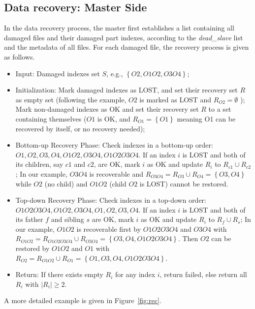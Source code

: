 \documentclass[conference]{IEEEtran}
\begin{document}
\subsection{Data recovery: Master Side}
In the data recovery process, the master first establishes a list containing all damaged files and their damaged part indexes, according to the \textit{dead\_slave} list and the metadata of all files. For each damaged file, the recovery process is given as follows.
\begin{itemize}
\item Input: Damaged indexes set $S$, e.g., $\left\{O2, O1O2, O3O4\right\}$;
\item Initialization: Mark damaged indexes as LOST, and set their recovery set $R$ as empty set (following the example, $O2$ is marked as LOST and $R_{O2} = \emptyset$ ); Mark non-damaged indexes as OK and set their recovery set $R$ to a set containing themselves ($O1$ is OK, and $R_{O1} = \left\{O1\right\}$ meaning O1 can be recovered by itself, or no recovery needed);
\item Bottom-up Recovery Phase: Check indexes in a bottom-up order: $O1, O2, O3, O4, O1O2, O3O4, O1O2O3O4$. If an index $i$ is LOST and both of its children, say $c1$ and $c2$, are OK, mark $i$ as OK and update $R_{i}$ to $R_{c1}\cup R_{c2}$; In our example, $O3O4$ is recoverable and $R_{O3O4} = R_{O3}\cup R_{O4} = \left\{O3, O4\right\}$ while $O2$ (no child) and $O1O2$ (child $O2$ is LOST) cannot be restored.
\item Top-down Recovery Phase: Check indexes in a top-down order: $O1O2O3O4, O1O2, O3O4, O1, O2, O3, O4$. If an index $i$ is LOST and both of its father $f$ and sibling $s$ are OK, mark $i$ as OK and update $R_{i}$ to $R_{f}\cup R_{s}$; In our example, $O1O2$ is recoverable first by $O1O2O3O4$ and $O3O4$ with $R_{O1O2} = R_{O1O2O3O4}\cup R_{O3O4} = \left\{O3, O4, O1O2O3O4\right\}$. Then $O2$ can be restored by $O1O2$ and $O1$ with $R_{O2} = R_{O1O2}\cup R_{O1} = \left\{O1, O3, O4, O1O2O3O4\right\}$.
\item Return: If there exists empty $R_i$ for any index $i$, return failed, else return all $R_i$ with $|R_i|\ge2$.
\end{itemize}
A more detailed example is given in Figure~\ref{fig:rec}.
\end{document}
